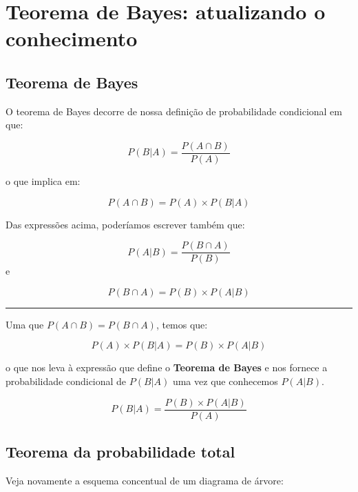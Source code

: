 \documentclass[
]{book}
\begin{document}
\hypertarget{tbayes}{%
\chapter{Teorema de Bayes: atualizando o conhecimento}\label{tbayes}}

\hypertarget{teorema-de-bayes}{%
\section{Teorema de Bayes}\label{teorema-de-bayes}}

O teorema de Bayes decorre de nossa definição de probabilidade condicional em que:

\[P(B|A) = \frac{P(A \cap B)}{P(A)}\]

o que implica em:

\[P(A \cap B) = P(A) \times P(B|A)\]

Das expressões acima, poderíamos escrever também que:

\[P(A|B) = \frac{P(B \cap A)}{P(B)}\]
e

\[P(B \cap A) = P(B) \times P(A|B)\]

\begin{center}\rule{0.5\linewidth}{0.5pt}\end{center}

Uma que \(P(A \cap B) = P(B \cap A)\), temos que:

\[P(A) \times P(B|A) = P(B) \times P(A|B)\]

o que nos leva à expressão que define o \textbf{Teorema de Bayes} e nos fornece a probabilidade condicional de \(P(B|A)\) uma vez que conhecemos \(P(A|B)\).

\[P(B|A) = \frac{P(B) \times P(A|B)}{P(A)}\]

\hypertarget{teorema-da-probabilidade-total}{%
\section{Teorema da probabilidade total}\label{teorema-da-probabilidade-total}}

Veja novamente a esquema concentual de um diagrama de árvore:
\end{document}
